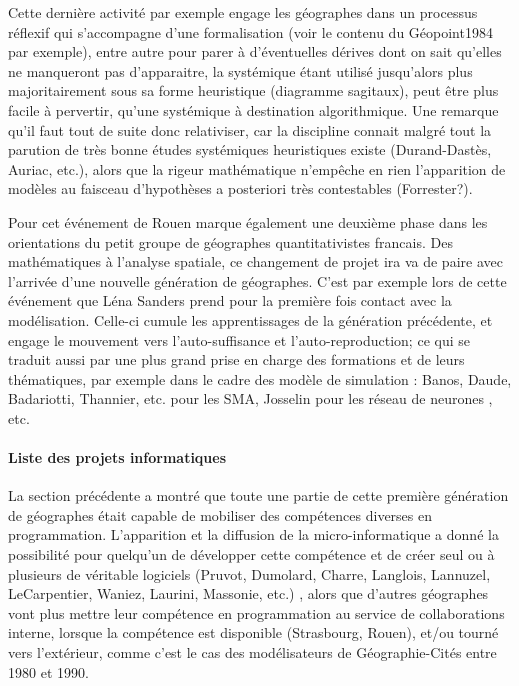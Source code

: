 Cette dernière activité par exemple engage les géographes dans un processus réflexif qui s'accompagne d'une formalisation (voir le contenu du Géopoint1984 par exemple), entre autre pour parer à d'éventuelles dérives dont on sait qu'elles ne manqueront pas d'apparaitre, la systémique étant utilisé jusqu'alors plus majoritairement sous sa forme heuristique (diagramme sagitaux), peut être plus facile à pervertir, qu'une systémique à destination algorithmique. Une remarque qu'il faut tout de suite donc relativiser, car la discipline connait malgré tout la parution de très bonne études systémiques heuristiques existe (Durand-Dastès, Auriac, etc.), alors que la rigeur mathématique n'empêche en rien l'apparition de modèles au faisceau d'hypothèses a posteriori très contestables (Forrester?). \textcite{Orain2006} %

Pour \autocite[320-321]{Cuyala2014} cet événement de Rouen marque également une deuxième phase dans les orientations du petit groupe de géographes quantitativistes francais. Des mathématiques à l'analyse spatiale, ce changement de projet ira va de paire avec l'arrivée d'une nouvelle génération de géographes. C'est par exemple lors de cette événement que Léna Sanders prend pour la première fois contact avec la modélisation. Celle-ci cumule les apprentissages de la génération précédente, et engage le mouvement vers l'auto-suffisance et l'auto-reproduction; ce qui se traduit aussi par une plus grand prise en charge des formations et de leurs thématiques, par exemple dans le cadre des modèle de simulation : Banos, Daude, Badariotti, Thannier, etc. pour les SMA, Josselin pour les réseau de neurones \autocite{Dumolard1994}, etc.

\paragraph{Liste des projets informatiques}

La section précédente a montré que toute une partie de cette première génération de géographes était capable de mobiliser des compétences diverses en programmation. L'apparition et la diffusion de la micro-informatique a donné la possibilité pour quelqu'un de développer cette compétence et de créer seul ou à plusieurs de véritable logiciels (Pruvot, Dumolard, Charre, Langlois, Lannuzel, LeCarpentier, Waniez, Laurini, Massonie, etc.) \autocites[191]{Mathieu2014, Massonie1986, Charre1989}, alors que d'autres géographes vont plus mettre leur compétence en programmation au service de collaborations interne, lorsque la compétence est disponible (Strasbourg, Rouen), et/ou tourné vers l'extérieur, comme c'est le cas des modélisateurs de Géographie-Cités entre 1980 et 1990.

